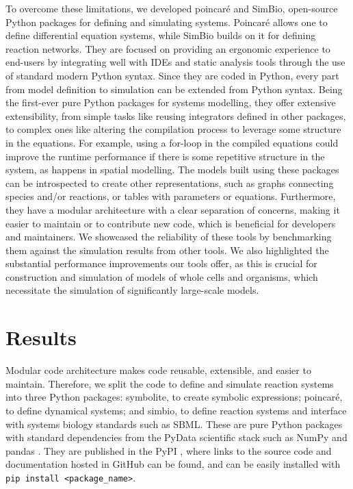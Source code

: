 \documentclass{article}
\begin{document}
To overcome these limitations, we developed poincaré and SimBio,
open-source Python packages for defining and simulating systems.
Poincaré allows one to define differential equation systems, while SimBio
builds on it for defining reaction networks. They are focused on
providing an ergonomic experience to end-users by integrating well with
\acp{IDE} and static analysis tools through the use of standard modern Python
syntax. Since they are coded in Python, every part from model definition
to simulation can be extended from Python syntax. Being the first-ever
pure Python packages for systems modelling, they offer extensive
extensibility, from simple tasks like reusing integrators defined in
other packages, to complex ones like altering the compilation process to
leverage some structure in the equations. For example, using a for-loop
in the compiled equations could improve the runtime performance if there
is some repetitive structure in the system, as happens in spatial
modelling. The models built using these packages can be introspected to
create other representations, such as graphs connecting species and/or
reactions, or tables with parameters or equations. Furthermore, they
have a modular architecture with a clear separation of concerns, making
it easier to maintain or to contribute new code, which is beneficial for
developers and maintainers. We showcased the reliability of these tools
by benchmarking them against the simulation results from other tools. We
also highlighted the substantial performance improvements our tools
offer, as this is crucial for construction and simulation of models of
whole cells and organisms, which necessitate the simulation of
significantly large-scale models.

\hypertarget{results}{%
\section{Results}\label{results}}



Modular code architecture makes code reusable, extensible, and easier to
maintain. Therefore, we split the code to define and simulate reaction
systems into three Python packages: symbolite, to create symbolic
expressions; poincaré, to define dynamical systems; and simbio, to
define reaction systems and interface with systems biology standards
such as \ac{SBML}. These are pure Python packages with standard dependencies
from the PyData scientific stack such as NumPy \cite{harrisArrayProgrammingNumPy2020}
and pandas \cite{mckinneyDataStructuresStatistical2010}. They are published in the \acf{PyPI}
, where links to the source code and documentation hosted
in GitHub can be found, and can be easily installed with
\texttt{pip\ install\ \textless{}package\_name\textgreater{}}.
\end{document}
